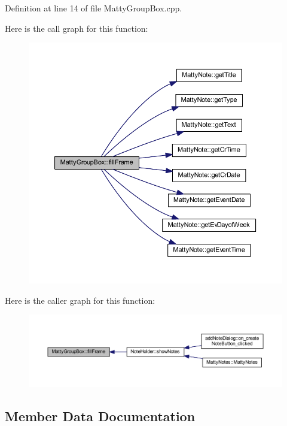 Definition at line 14 of file Matty\+Group\+Box.\+cpp.

Here is the call graph for this function\+:
\nopagebreak
\begin{figure}[H]
\begin{center}
\leavevmode
\includegraphics[width=350pt]{classMattyGroupBox_a4cbc1800e9ec63cdd0e064d3a3738b80_cgraph}
\end{center}
\end{figure}
Here is the caller graph for this function\+:
\nopagebreak
\begin{figure}[H]
\begin{center}
\leavevmode
\includegraphics[width=350pt]{classMattyGroupBox_a4cbc1800e9ec63cdd0e064d3a3738b80_icgraph}
\end{center}
\end{figure}


\subsection{Member Data Documentation}
\hypertarget{classMattyGroupBox_ab51a570cfe8b06f8ae06a7163fb09d4f}{}\label{classMattyGroupBox_ab51a570cfe8b06f8ae06a7163fb09d4f} 
